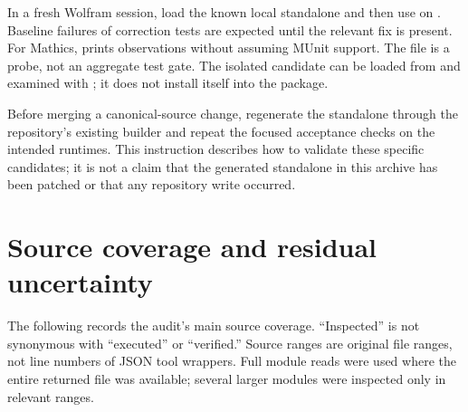 \documentclass[11pt,letterpaper]{article}
\newcommand{\code}[1]{\texttt{\detokenize{#1}}}
\begin{document}
In a fresh Wolfram session, load the known local standalone and then use
\code{TestReport} on . Baseline failures of
correction tests are expected until the relevant fix is present. For Mathics,
 prints observations without assuming MUnit
support. The file is a probe, not an aggregate test gate. The isolated candidate
can be loaded from  and examined
with ; it does not install itself into
the package.

Before merging a canonical-source change, regenerate the standalone through
the repository's existing builder and repeat the focused acceptance checks on
the intended runtimes. This instruction describes how to validate these
specific candidates; it is not a claim that the generated standalone in this
archive has been patched or that any repository write occurred.

\appendix
\section{Source coverage and residual uncertainty}

The following records the audit's main source coverage. ``Inspected'' is not
synonymous with ``executed'' or ``verified.'' Source ranges are original file
ranges, not line numbers of JSON tool wrappers. Full module reads were used
where the entire returned file was available; several larger modules were
inspected only in relevant ranges.
\end{document}
